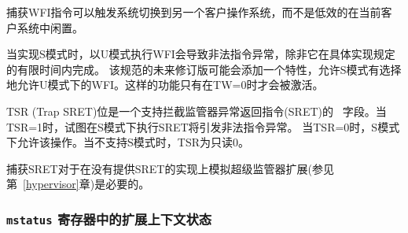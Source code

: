 \iffalse
\begin{commentary}
Trapping the WFI
instruction can trigger a world switch to another guest OS, rather than
wastefully idling in the current guest.
\end{commentary}
\fi

\begin{commentary}
捕获WFI指令可以触发系统切换到另一个客户操作系统，而不是低效的在当前客户系统中闲置。
\end{commentary}

\iffalse
When S-mode is implemented, then executing WFI in U-mode causes an illegal
instruction exception, unless it completes within an implementation-specific,
bounded time limit.  A future revision of this specification might add
a feature that allows S-mode to selectively permit WFI in U-mode.  Such
a feature would only be active when TW=0.

The TSR (Trap SRET) bit is a \warl\ field that
supports intercepting the supervisor exception return
instruction, SRET.  When TSR=1, attempts to execute SRET while executing in
S-mode will raise an illegal instruction exception.  When TSR=0, this
operation is permitted in S-mode.  TSR is read-only 0 when S-mode is not
supported.
\fi

当实现S模式时，以U模式执行WFI会导致非法指令异常，除非它在具体实现规定的有限时间内完成。
该规范的未来修订版可能会添加一个特性，允许S模式有选择地允许U模式下的WFI。这样的功能只有在TW=0时才会被激活。

TSR (Trap SRET)位是一个支持拦截监管器异常返回指令(SRET)的 \warl\ 字段。当TSR=1时，试图在S模式下执行SRET将引发非法指令异常。
当TSR=0时，S模式下允许该操作。当不支持S模式时，TSR为只读0。

\iffalse
\begin{commentary}
Trapping SRET is necessary to emulate the hypervisor extension
(see Chapter~\ref{hypervisor}) on implementations that do not provide it.
\end{commentary}
\fi

\begin{commentary}
捕获SRET对于在没有提供SRET的实现上模拟超级监管器扩展(参见第~\ref{hypervisor}章)是必要的。
\end{commentary}


\subsubsection{{\tt mstatus} 寄存器中的扩展上下文状态}

